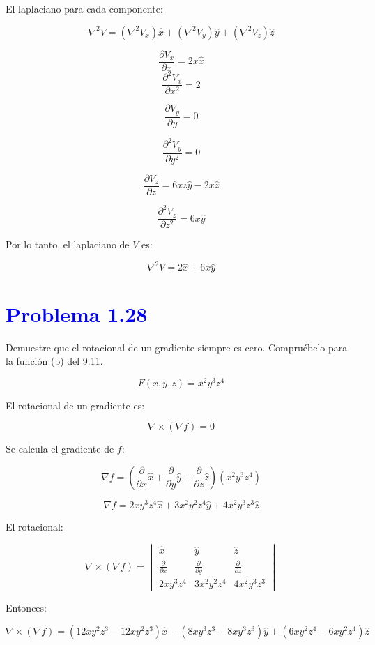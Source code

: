 \documentclass[12pt]{article}
\newcommand{\question}[1]{\textcolor{blue}{\textbf{#1}}}
\begin{document}
El laplaciano para cada componente:

\[
\nabla^2 V = \left( \nabla^2 V_x \right) \hat{x} + \left( \nabla^2 V_y \right) \hat{y} + \left( \nabla^2 V_z \right) \hat{z}
\]


\[
\frac{\partial V_x}{\partial x} = 2x \hat{x}
\] \[
\frac{\partial^2 V_x}{\partial x^2} = 2
\]


\[
\frac{\partial V_y}{\partial y} = 0
\]

\[
\frac{\partial^2 V_y}{\partial y^2} = 0
\]

\[
\frac{\partial V_z}{\partial z} = 6xz\hat{y} - 2x\hat{z}
\]

\[
\frac{\partial^2 V_z}{\partial z^2} = 6x \hat{y}
\]

Por lo tanto, el laplaciano de \( V \) es:

\[
\boxed{\nabla^2 V = 2 \hat{x} + 6x \hat{y}}
\]

\section*{\question{Problema 1.28} }Demuestre que el rotacional de un gradiente siempre es cero. Compruébelo para la función (b) del 9.11.

\[
F(x,y,z) = x^2 y^3 z^4
\]

El rotacional de un gradiente es:

\[
\nabla \times (\nabla f) = 0
\]

Se calcula el gradiente de \( f \):

\[
\nabla f = \left( \frac{\partial}{\partial x} \hat{x} + \frac{\partial}{\partial y} \hat{y} + \frac{\partial}{\partial z} \hat{z} \right) (x^2 y^3 z^4)
\]

\[
\nabla f = 2x y^3 z^4 \hat{x} + 3x^2 y^2 z^4 \hat{y} + 4x^2 y^3 z^3 \hat{z}
\]

El rotacional:

\[
\nabla \times (\nabla f) =
\begin{vmatrix}
\hat{x} & \hat{y} & \hat{z} \\
\frac{\partial}{\partial x} & \frac{\partial}{\partial y} & \frac{\partial}{\partial z} \\
2x y^3 z^4 & 3x^2 y^2 z^4 & 4x^2 y^3 z^3
\end{vmatrix}
\]

Entonces:

\[
\nabla \times (\nabla f) = (12x y^2 z^3 - 12x y^2 z^3) \hat{x} - (8x y^3 z^3 - 8x y^3 z^3) \hat{y} + (6x y^ 2 z^4 - 6x y^2 z^4) \hat{z} 
\]
\end{document}
